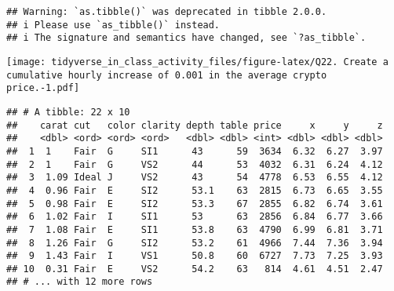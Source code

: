 \documentclass[
]{article}
\newenvironment{Shaded}{\begin{snugshade}}{\end{snugshade}}
\newcommand{\AttributeTok}[1]{\textcolor[rgb]{0.77,0.63,0.00}{#1}}
\newcommand{\CommentTok}[1]{\textcolor[rgb]{0.56,0.35,0.01}{\textit{#1}}}
\newcommand{\DecValTok}[1]{\textcolor[rgb]{0.00,0.00,0.81}{#1}}
\newcommand{\FunctionTok}[1]{\textcolor[rgb]{0.00,0.00,0.00}{#1}}
\newcommand{\NormalTok}[1]{#1}
\newcommand{\OtherTok}[1]{\textcolor[rgb]{0.56,0.35,0.01}{#1}}
\newcommand{\SpecialCharTok}[1]{\textcolor[rgb]{0.00,0.00,0.00}{#1}}
\begin{document}
\begin{verbatim}
## Warning: `as.tibble()` was deprecated in tibble 2.0.0.
## i Please use `as_tibble()` instead.
## i The signature and semantics have changed, see `?as_tibble`.
\end{verbatim}

\begin{Shaded}
\end{Shaded}

\texttt{[image: tidyverse\_in\_class\_activity\_files/figure-latex/Q22. Create a cumulative hourly increase of 0.001 in the average crypto price.-1.pdf]}

\begin{Shaded}
\end{Shaded}

\begin{verbatim}
## # A tibble: 22 x 10
##    carat cut   color clarity depth table price     x     y     z
##    <dbl> <ord> <ord> <ord>   <dbl> <dbl> <int> <dbl> <dbl> <dbl>
##  1  1    Fair  G     SI1      43      59  3634  6.32  6.27  3.97
##  2  1    Fair  G     VS2      44      53  4032  6.31  6.24  4.12
##  3  1.09 Ideal J     VS2      43      54  4778  6.53  6.55  4.12
##  4  0.96 Fair  E     SI2      53.1    63  2815  6.73  6.65  3.55
##  5  0.98 Fair  E     SI2      53.3    67  2855  6.82  6.74  3.61
##  6  1.02 Fair  I     SI1      53      63  2856  6.84  6.77  3.66
##  7  1.08 Fair  E     SI1      53.8    63  4790  6.99  6.81  3.71
##  8  1.26 Fair  G     SI2      53.2    61  4966  7.44  7.36  3.94
##  9  1.43 Fair  I     VS1      50.8    60  6727  7.73  7.25  3.93
## 10  0.31 Fair  E     VS2      54.2    63   814  4.61  4.51  2.47
## # ... with 12 more rows
\end{verbatim}
\end{document}
